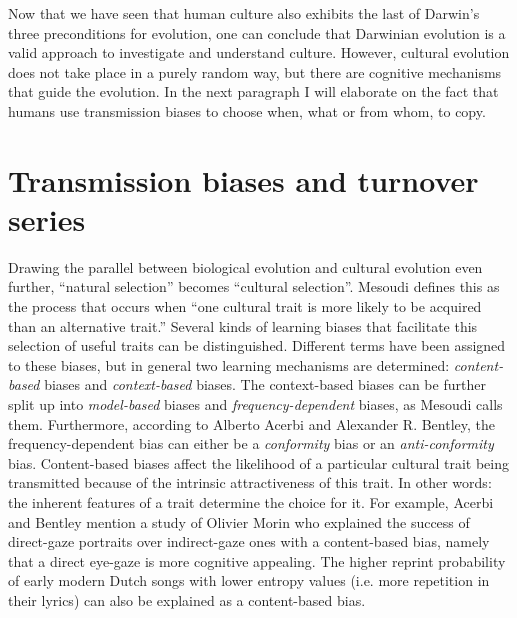 Now that we have seen that human culture also exhibits the last of Darwin's three preconditions for evolution, one can conclude that Darwinian evolution is a valid approach to investigate and understand culture. However, cultural evolution does not take place in a purely random way, but there are cognitive mechanisms that guide the evolution. In the next paragraph I will elaborate on the fact that humans use transmission biases to choose when, what or from whom, to copy.

\section{Transmission biases and turnover series}
Drawing the parallel between biological evolution and cultural evolution even further, \enquote{natural selection} becomes \enquote{cultural selection}. Mesoudi defines this as the process that occurs when \enquote{one cultural trait is more likely to be acquired than an alternative trait.}\autocite[56]{mesoudi_cultural_2011} Several kinds of learning biases that facilitate this selection of useful traits can be distinguished. Different terms have been assigned to these biases, but in general two learning mechanisms are determined: \textit{content-based} biases and \textit{context-based} biases.\autocites[56]{mesoudi_cultural_2011}[129]{henrich_evolution_2003,boyd_culture_1985} The context-based biases can be further split up into \textit{model-based }biases and \textit{frequency-dependent} biases, as Mesoudi calls them.\autocite[56]{mesoudi_cultural_2011} Furthermore, according to Alberto Acerbi and Alexander R. Bentley, the frequency-dependent bias can either be a \textit{conformity} bias or an \textit{anti-conformity} bias.\autocite[229]{acerbi_biases_2014} Content-based biases affect the likelihood of a particular cultural trait being transmitted because of the intrinsic attractiveness of this trait. In other words: the inherent features of a trait determine the choice for it.\autocites[65]{mesoudi_cultural_2011}[129]{ henrich_evolution_2003} For example, Acerbi and Bentley mention a study of Olivier Morin who explained the success of direct-gaze portraits over indirect-gaze ones with a content-based bias, namely that a direct eye-gaze is more cognitive appealing.\autocites{morin_how_2013}[as cited in][228]{acerbi_biases_2014} The higher reprint probability of early modern Dutch songs with lower entropy values (i.e. more repetition in their lyrics) can also be explained as a content-based bias.\autocite{lassche_repetition_2019}

